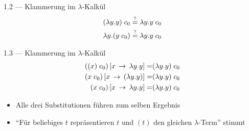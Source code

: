 \documentclass{beamer}
\begin{document}
\setcounter{equation}{0}

\begin{frame}{1.2 --- Klammerung im $\lambda$-Kalkül}
	\begin{eqnarray}
		(\lambda{}y.y)\;{}c_0 \stackrel{?}{=} \lambda{}y.y\;{}c_0 \\
		\lambda{}y.(y\;{}c_0) \stackrel{?}{=} \lambda{}y.y\;{}c_0
	\end{eqnarray}


\end{frame}

\setcounter{equation}{0}

\begin{frame}{1.3 --- Klammerung im $\lambda$-Kalkül}
	\begin{eqnarray}
		((x)\;{}c_0)\left[x\,\to\,\lambda{}y.y\right] =& (\lambda{}y.y)\;{}c_0 \\
		(x\;{}c_0)\left[x\,\to\,(\lambda{}y.y)\right] =& (\lambda{}y.y)\;{}c_0 \\
		(x\;{}c_0)\left[x\,\to\,\lambda{}y.y\right] =& (\lambda{}y.y)\;{}c_0
	\end{eqnarray}

	\begin{itemize}
		\item Alle drei Substitutionen führen zum selben Ergebnis
		\item \enquote{Für beliebiges $t$ repräsentieren $t$ und $(t)$ den gleichen $\lambda$-Term} stimmt
	\end{itemize}
\end{frame}
\end{document}
